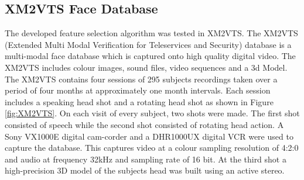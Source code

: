 \subsection{XM2VTS Face Database}
\label{sec:faceveri:xm2vts}
The developed feature selection algorithm was tested in XM2VTS\cite{Messer1999}. 
The XM2VTS (Extended Multi Modal Verification for Teleservices and Security) database is a multi-modal face database which is captured onto high quality digital video. The XM2VTS includes colour images, sound files, video sequences and a 3d Model. The XM2VTS contains four sessions of 295 subjects recordings taken over a period of four months at approximately one month intervals.  Each session includes a speaking head shot and a rotating head shot as shown in \mbox{Figure} \ref{fig:XM2VTS}. On each visit of every subject, two shots were made. The first shot consisted of speech while the second shot consisted of rotating head action. A Sony VX1000E digital cam-corder and a DHR1000UX digital VCR were used to capture the database. This captures video at a colour sampling resolution of 4:2:0 and audio at frequency 32kHz and sampling rate of 16 bit. At the third shot a high-precision 3D model of the subjects head was built using an active stereo.
